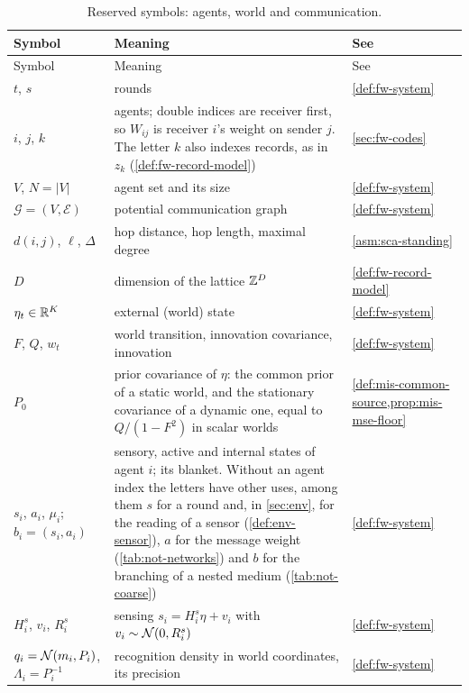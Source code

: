 \begingroup
\small
\setlength{\tabcolsep}{4pt}
\begin{longtable}{@{}>{\raggedright\arraybackslash}p{}>{\raggedright\arraybackslash}p{}>{\raggedright\arraybackslash}p{}@{}}
\caption{Reserved symbols: agents, world and communication.}\label{tab:not-agents}\\
\toprule
Symbol & Meaning & See\\
\midrule
\endfirsthead
\toprule
Symbol & Meaning & See\\
\midrule
\endhead
\bottomrule
\endfoot
$t$, $s$ & rounds & \cref{def:fw-system}\\
$i$, $j$, $k$ & agents; double indices are receiver first, so $W_{ij}$ is receiver $i$'s weight on sender $j$. The letter $k$ also indexes records, as in $z_k$ (\cref{def:fw-record-model}) & \cref{sec:fw-codes}\\
$V$, $N=\lvert V\rvert$ & agent set and its size & \cref{def:fw-system}\\
$\mathcal G=(V,\mathcal E)$ & potential communication graph & \cref{def:fw-system}\\
$d(i,j)$, $\ell$, $\Delta$ & hop distance, hop length, maximal degree & \cref{asm:sca-standing}\\
$D$ & dimension of the lattice $\mathbb{Z}^D$ & \cref{def:fw-record-model}\\
$\eta_t\in\mathbb{R}^K$ & external (world) state & \cref{def:fw-system}\\
$F$, $Q$, $w_t$ & world transition, innovation covariance, innovation & \cref{def:fw-system}\\
$P_0$ & prior covariance of $\eta$: the common prior of a static world, and the stationary covariance of a dynamic one, equal to $Q/(1-F^2)$ in scalar worlds & \cref{def:mis-common-source,prop:mis-mse-floor}\\
$s_i$, $a_i$, $\mu_i$; $b_i=(s_i,a_i)$ & sensory, active and internal states of agent $i$; its blanket. Without an agent index the letters have other uses, among them $s$ for a round and, in \cref{sec:env}, for the reading of a sensor (\cref{def:env-sensor}), $a$ for the message weight (\cref{tab:not-networks}) and $b$ for the branching of a nested medium (\cref{tab:not-coarse}) & \cref{def:fw-system}\\
$H^s_i$, $v_i$, $R^s_i$ & sensing $s_i=H^s_i\eta+v_i$ with $v_i\sim\mathcal{N}(0,R^s_i)$ & \cref{def:fw-system}\\
$q_i=\mathcal{N}(m_i,P_i)$, $\Lambda_i=P_i^{-1}$ & recognition density in world coordinates, its precision & \cref{def:fw-system}\\

\end{longtable}
